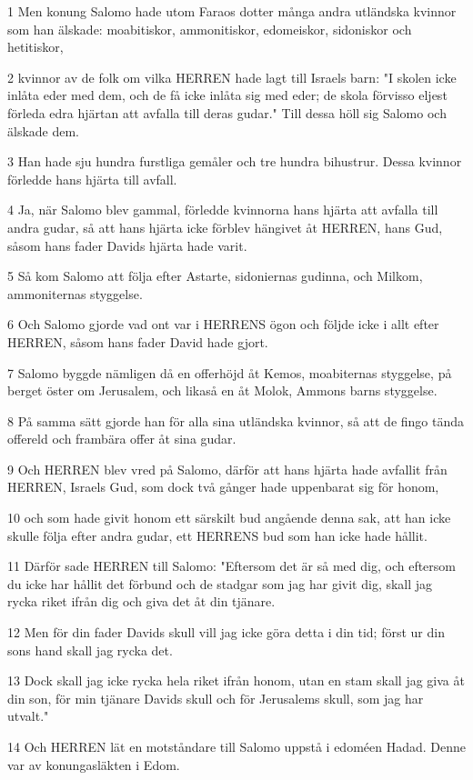 \par 1 Men konung Salomo hade utom Faraos dotter många andra utländska kvinnor som han älskade: moabitiskor, ammonitiskor, edomeiskor, sidoniskor och hetitiskor,
\par 2 kvinnor av de folk om vilka HERREN hade lagt till Israels barn: "I skolen icke inlåta eder med dem, och de få icke inlåta sig med eder; de skola förvisso eljest förleda edra hjärtan att avfalla till deras gudar." Till dessa höll sig Salomo och älskade dem.
\par 3 Han hade sju hundra furstliga gemåler och tre hundra bihustrur. Dessa kvinnor förledde hans hjärta till avfall.
\par 4 Ja, när Salomo blev gammal, förledde kvinnorna hans hjärta att avfalla till andra gudar, så att hans hjärta icke förblev hängivet åt HERREN, hans Gud, såsom hans fader Davids hjärta hade varit.
\par 5 Så kom Salomo att följa efter Astarte, sidoniernas gudinna, och Milkom, ammoniternas styggelse.
\par 6 Och Salomo gjorde vad ont var i HERRENS ögon och följde icke i allt efter HERREN, såsom hans fader David hade gjort.
\par 7 Salomo byggde nämligen då en offerhöjd åt Kemos, moabiternas styggelse, på berget öster om Jerusalem, och likaså en åt Molok, Ammons barns styggelse.
\par 8 På samma sätt gjorde han för alla sina utländska kvinnor, så att de fingo tända offereld och frambära offer åt sina gudar.
\par 9 Och HERREN blev vred på Salomo, därför att hans hjärta hade avfallit från HERREN, Israels Gud, som dock två gånger hade uppenbarat sig för honom,
\par 10 och som hade givit honom ett särskilt bud angående denna sak, att han icke skulle följa efter andra gudar, ett HERRENS bud som han icke hade hållit.
\par 11 Därför sade HERREN till Salomo: "Eftersom det är så med dig, och eftersom du icke har hållit det förbund och de stadgar som jag har givit dig, skall jag rycka riket ifrån dig och giva det åt din tjänare.
\par 12 Men för din fader Davids skull vill jag icke göra detta i din tid; först ur din sons hand skall jag rycka det.
\par 13 Dock skall jag icke rycka hela riket ifrån honom, utan en stam skall jag giva åt din son, för min tjänare Davids skull och för Jerusalems skull, som jag har utvalt."
\par 14 Och HERREN lät en motståndare till Salomo uppstå i edoméen Hadad. Denne var av konungasläkten i Edom.
